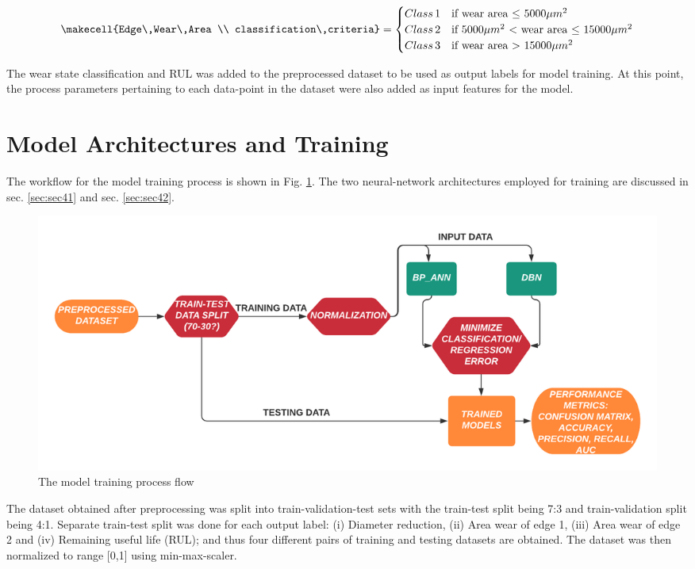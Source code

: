 \documentclass[preprint,review,12pt]{elsarticle}
\begin{document}
\begin{equation}\label{eq:eq33}
 \makecell{Edge\,Wear\,Area \\ classification\,criteria} =
 \begin{cases}
   Class\,1 & \text{if wear area $\leq$ $5000\mu{m}^2$} \\
   Class\,2 & \text{if $5000\mu{m}^2$ $<$ wear area $\leq$ $15000\mu{m}^2$} \\
   Class\,3 & \text{if wear area $>$ $15000\mu{m}^2$}
 \end{cases}
\end{equation}

The wear state classification and RUL was added to the preprocessed dataset to be used as output labels for model training. At this point, the process parameters pertaining to each data-point in the dataset were also added as input features for the model. \par


\section{Model Architectures and Training}\label{chap:model}
The workflow for the model training process is shown in Fig. \ref{fig:fig321}. The two neural-network architectures employed for training are discussed in sec. \ref{sec:sec41} and sec. \ref{sec:sec42}. \par

\begin{figure}[!h]
  \begin{center}
    \includegraphics[width=\linewidth]{321.png}
    \caption{The model training process flow}\label{fig:fig321}
  \end{center}
\end{figure}

The dataset obtained after preprocessing was split into train-validation-test sets with the train-test split being 7:3 and train-validation split being 4:1. Separate train-test split was done for each output label: (i) Diameter reduction, (ii) Area wear of edge 1, (iii) Area wear of edge 2 and (iv) Remaining useful life (RUL); and thus four different pairs of training and testing datasets are obtained. The dataset was then normalized to range [0,1] using min-max-scaler. \par
\end{document}
